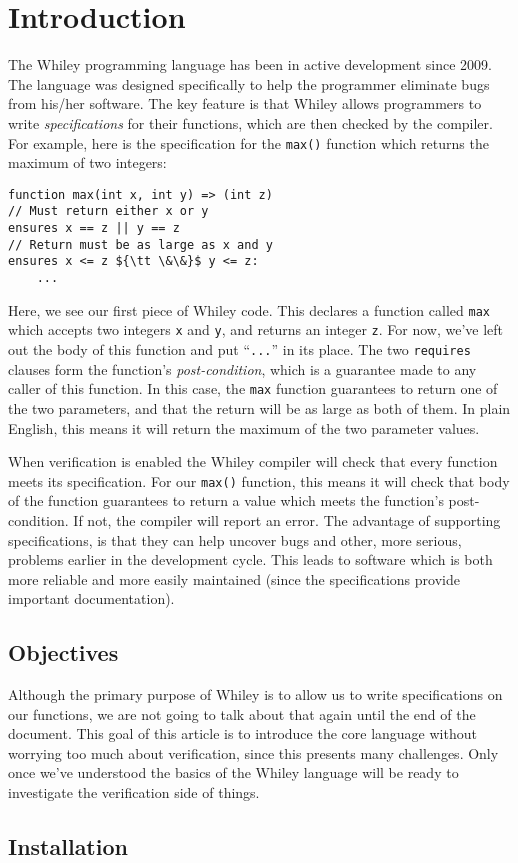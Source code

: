 \section{Introduction}
The Whiley programming language has been in active development since
2009.  The language was designed specifically to help the programmer
eliminate bugs from his/her software.  The key feature is that Whiley
allows programmers to write {\em specifications} for their functions,
which are then checked by the compiler.  For example, here is the
specification for the \lstinline{max()} function which returns the
maximum of two integers:

\begin{lstlisting}
function max(int x, int y) => (int z)
// Must return either x or y
ensures x == z || y == z
// Return must be as large as x and y
ensures x <= z ${\tt \&\&}$ y <= z:
    ...
\end{lstlisting}
Here, we see our first piece of Whiley code.  This declares a function
called \lstinline{max} which accepts two integers \lstinline{x} and
\lstinline{y}, and returns an integer \lstinline{z}.  For now, we've
left out the body of this function and put ``\lstinline{...}'' in its
place.  The two \lstinline{requires} clauses form the function's {\em
  post-condition}, which is a guarantee made to any caller of this
function.  In this case, the \lstinline{max} function guarantees to
return one of the two parameters, and that the return will be as large
as both of them.  In plain English, this means it will return the
maximum of the two parameter values.  

When verification is enabled the Whiley compiler will check that every
function meets its specification.  For our \lstinline{max()} function,
this means it will check that body of the function guarantees to
return a value which meets the function's post-condition.  If not, the
compiler will report an error.  The advantage of supporting
specifications, is that they can help uncover bugs and other, more
serious, problems earlier in the development cycle.  This leads to
software which is both more reliable and more easily maintained (since
the specifications provide important documentation).

\subsection{Objectives}

Although the primary purpose of Whiley is to allow us to write
specifications on our functions, we are not going to talk about that
again until the end of the document.  This goal of this article is to
introduce the core language without worrying too much about
verification, since this presents many challenges.  Only once we've
understood the basics of the Whiley language will be ready to
investigate the verification side of things.

\subsection{Installation}


